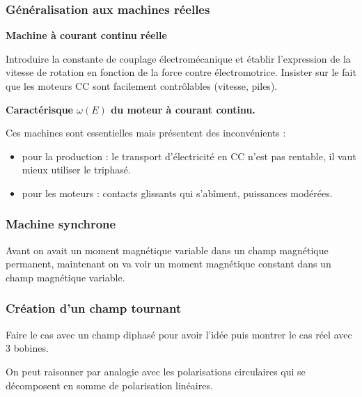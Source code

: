 \subsubsection{Généralisation aux machines réelles}

\begin{slide}
\textbf{Machine à courant continu réelle}
\end{slide}

Introduire la constante de couplage électromécanique et établir l'expression de la vitesse de rotation en fonction de la force contre électromotrice.
Insister sur le fait que les moteurs CC sont facilement contrôlables (vitesse, piles).

\begin{experience}
\textbf{Caractérisque $\omega(E)$ du moteur à courant continu.}
\end{experience}

\begin{transition}
Ces machines sont essentielles mais présentent des inconvénients :
\begin{itemize}
\item pour la production : le transport d'électricité en CC n'est pas rentable, il vaut mieux utiliser le triphasé.
\item pour les moteurs : contacts glissants qui s'abîment, puissances modérées. 
\end{itemize}
\end{transition}

\subsubsection{Machine synchrone}

Avant on avait un moment magnétique variable dans un champ magnétique permanent, maintenant on va voir un moment magnétique constant dans un champ magnétique variable.

\subsubsection{Création d'un champ tournant}
\label{sec:lp09_rotating_field}

Faire le cas avec un champ diphasé pour avoir l'idée puis montrer le cas réel avec 3 bobines.

\begin{remarque}
On peut raisonner par analogie avec les polarisations circulaires qui se décomposent en somme de polarisation linéaires.
\end{remarque}


